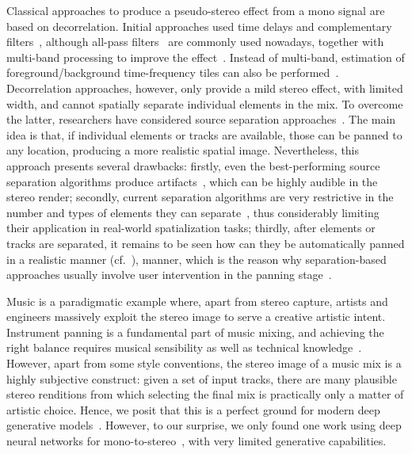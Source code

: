 \documentclass{article}
\def\final{}
\begin{document}
Classical approaches to produce a pseudo-stereo effect from a mono signal are based on decorrelation. Initial approaches used time delays and complementary filters~\cite{Schroeder_1958}, although all-pass filters~\cite{Bauer_1963} are commonly used nowadays, together with multi-band processing to improve the effect~\cite{Orban_1970,Faller_2005,Fink_2015}. Instead of multi-band, estimation of foreground/background time-frequency tiles can also be performed~\cite{Uhle_2016}. Decorrelation approaches, however, only provide a mild stereo effect, with limited width, and cannot spatially separate individual elements in the mix. To overcome the latter, researchers have considered source separation approaches~\cite{Lagrange_2007,FitzGerald_2011,DelgadoCastro_2019}. The main idea is that, if individual elements or tracks are available, those can be panned to any location, producing a more realistic spatial image. Nevertheless, this approach presents several drawbacks: firstly, even the best-performing source separation algorithms produce artifacts~\cite{Pons_2021}, which can be highly audible in the stereo render; secondly, current separation algorithms are very restrictive in the number and types of elements they can separate~\cite{cano2018musical}, thus considerably limiting their application in real-world spatialization tasks; thirdly, after elements or tracks are separated, it remains to be seen how can they be automatically panned in a realistic 
\ifdefined\final
manner (cf.~\cite{Steinmetz_2021}), 
\else
manner, 
\fi
which is the reason why separation-based approaches usually involve user intervention in the panning stage~\cite{Lagrange_2007,FitzGerald_2011,DelgadoCastro_2019}. 

Music is a paradigmatic example where, apart from stereo capture, artists and engineers massively exploit the stereo image to serve a creative artistic intent. Instrument panning is a fundamental part of music mixing, and achieving the right balance requires musical sensibility as well as technical knowledge~\cite{Gibson_2005}. However, apart from some style conventions, the stereo image of a music mix is a highly subjective construct: given a set of input tracks, there are many plausible stereo renditions from which selecting the final mix is practically only a matter of artistic choice. Hence, we posit that this is a perfect ground for modern deep generative models~\cite{Tomczak_2022}. However, to our surprise, we only found one work using deep neural networks for mono-to-stereo~\cite{Chun_2015}, with very limited generative capabilities.
\end{document}
